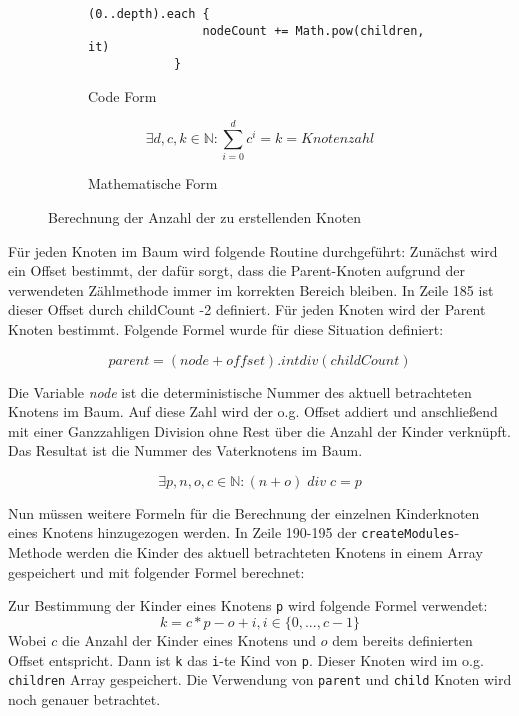 \begin{figure} [hbt!]
	\begin{subfigure}{\textwidth}
		\begin{lstlisting}[frame=none]
			(0..depth).each {
				nodeCount += Math.pow(children, it)
			}
		\end{lstlisting}
		\caption{Code Form}
		\label{fig:gen-module-code}
	\end{subfigure}

	\begin{subfigure}{\textwidth}
		
			\[ \exists d, c, k \in \mathbb{N}: \sum_{i=0}^{d} c^{i} = k = Knotenzahl \]
		

		\caption{Mathematische Form}
		\label{fig:gen-module-formula}
	\end{subfigure}
	
	\caption{Berechnung der Anzahl der zu erstellenden Knoten}
	\label{fig:gen-module}
\end{figure}




Für jeden Knoten im Baum wird folgende Routine durchgeführt:
Zunächst wird ein Offset bestimmt, der dafür sorgt, dass die Parent-Knoten aufgrund der verwendeten Zählmethode immer im korrekten Bereich bleiben. 
In Zeile 185 ist dieser Offset durch childCount -2 definiert.
Für jeden Knoten wird der Parent Knoten bestimmt.
Folgende Formel wurde für diese Situation definiert:

\[parent = (node + offset).intdiv(childCount)\]

Die Variable \textit{node} ist die deterministische Nummer des aktuell betrachteten Knotens im Baum. 
Auf diese Zahl wird der o.g. Offset addiert und anschließend  mit einer Ganzzahligen Division ohne Rest über die Anzahl der Kinder verknüpft. Das Resultat ist die Nummer des Vaterknotens im Baum.

\[ \exists p, n, o, c \in \mathbb{N} : (n+o) \; div \; c =p \]

Nun müssen weitere Formeln für die Berechnung der einzelnen Kinderknoten eines Knotens hinzugezogen werden. 
In Zeile 190-195 der \texttt{createModules}-Methode werden die Kinder des aktuell betrachteten Knotens in einem Array gespeichert und mit folgender Formel berechnet:

Zur Bestimmung der Kinder eines Knotens \texttt{p} wird folgende Formel verwendet:
\[k= c*p-o+i, i \in \{0,...,c-1\}\]
Wobei $c$  die Anzahl der Kinder eines Knotens und $o$ dem bereits definierten Offset entspricht.
Dann ist \texttt{k} das \texttt{i}-te Kind von \texttt{p}.
Dieser Knoten wird im o.g. \texttt{children} Array gespeichert. 
Die Verwendung von \texttt{parent} und \texttt{child} Knoten wird noch genauer betrachtet.

